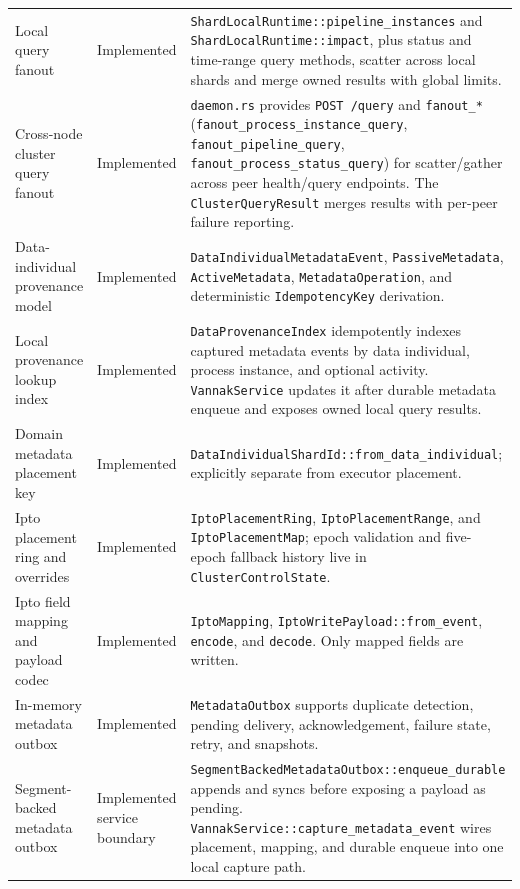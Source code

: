 \begin{longtable}{p{}p{}p{}}
Local query fanout & Implemented &
\texttt{ShardLocalRuntime::pipeline\_instances} and
\texttt{ShardLocalRuntime::impact}, plus status and time-range query methods,
scatter across local shards and merge owned results with global limits. \\
Cross-node cluster query fanout & Implemented &
\texttt{daemon.rs} provides \texttt{POST /query} and \texttt{fanout\_*}
(\texttt{fanout\_process\_instance\_query},
\texttt{fanout\_pipeline\_query},
\texttt{fanout\_process\_status\_query}) for scatter/gather across peer
health/query endpoints. The \texttt{ClusterQueryResult} merges results
with per-peer failure reporting. \\

Data-individual provenance model & Implemented &
\texttt{DataIndividualMetadataEvent}, \texttt{PassiveMetadata},
\texttt{ActiveMetadata}, \texttt{MetadataOperation}, and deterministic
\texttt{IdempotencyKey} derivation. \\

Local provenance lookup index & Implemented &
\texttt{DataProvenanceIndex} idempotently indexes captured metadata events by
data individual, process instance, and optional activity. \texttt{VannakService}
updates it after durable metadata enqueue and exposes owned local query results.
\\

Domain metadata placement key & Implemented &
\texttt{DataIndividualShardId::from\_data\_individual}; explicitly separate
from \sitas{} executor placement. \\

Ipto placement ring and overrides & Implemented &
\texttt{IptoPlacementRing}, \texttt{IptoPlacementRange}, and
\texttt{IptoPlacementMap}; epoch validation and five-epoch fallback history
live in \texttt{ClusterControlState}. \\

Ipto field mapping and payload codec & Implemented &
\texttt{IptoMapping}, \texttt{IptoWritePayload::from\_event},
\texttt{encode}, and \texttt{decode}. Only mapped fields are written. \\

In-memory metadata outbox & Implemented &
\texttt{MetadataOutbox} supports duplicate detection, pending delivery,
acknowledgement, failure state, retry, and snapshots. \\

Segment-backed metadata outbox & Implemented service boundary &
\texttt{SegmentBackedMetadataOutbox::enqueue\_durable} appends and syncs before
exposing a payload as pending. \texttt{VannakService::capture\_metadata\_event}
wires placement, mapping, and durable enqueue into one local capture path. \\


\end{longtable}
